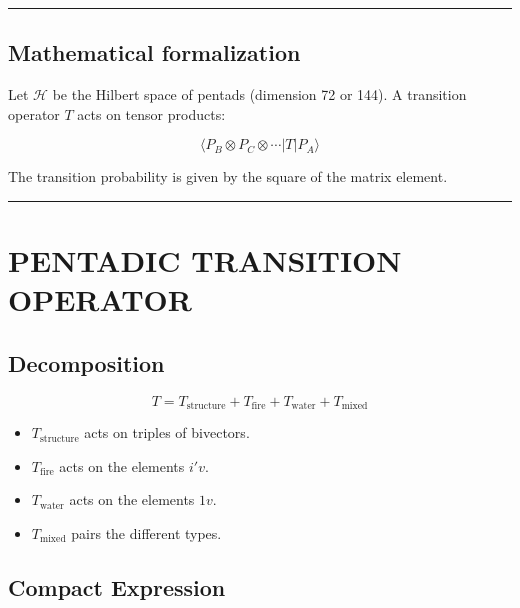 \documentclass[11pt]{article}
\providecommand{\tightlist}{%
\setlength{\itemsep}{2pt}\setlength{\parskip}{6pt}
}
\begin{document}
\begin{center}\rule{0.5\linewidth}{0.5pt}\end{center}

\hypertarget{mathematical-formalization}{%
\subsection{Mathematical
formalization}\label{mathematical-formalization}}

Let \(\mathcal{H}\) be the Hilbert space of pentads (dimension 72 or
144). A transition operator \(T\) acts on tensor products:

\[
\langle P_B \otimes P_C \otimes \cdots | T | P_A \rangle
\]

The transition probability is given by the square of the matrix element.

\begin{center}\rule{0.5\linewidth}{0.5pt}\end{center}

\hypertarget{pentadic-transition-operator}{%
\section{PENTADIC TRANSITION
OPERATOR}\label{pentadic-transition-operator}}

\hypertarget{decomposition}{%
\subsection{Decomposition}\label{decomposition}}

\[
T = T_{\text{structure}} + T_{\text{fire}} + T_{\text{water}} + T_{\text{mixed}}
\]

\begin{itemize}
\tightlist
\item
  \(T_{\text{structure}}\) acts on triples of bivectors.
\item
  \(T_{\text{fire}}\) acts on the elements \(i'v\).
\item
  \(T_{\text{water}}\) acts on the elements \(1v\).
\item
  \(T_{\text{mixed}}\) pairs the different types.
\end{itemize}

\hypertarget{compact-expression}{%
\subsection{Compact Expression}\label{compact-expression}}
\end{document}
